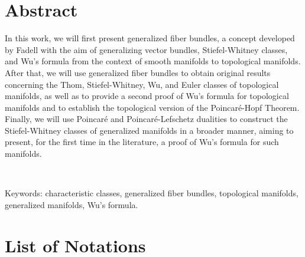 \documentclass[12pt,oneside]{book}
\begin{document}
    \chapter*{Abstract}
    \thispagestyle{empty}

    In this work, we will first present generalized fiber bundles, a concept developed by Fadell with the aim 
    of generalizing vector bundles, Stiefel-Whitney classes, and Wu's formula from the context of smooth 
    manifolds to topological manifolds. After that, we will use generalized fiber bundles to obtain original 
    results concerning the Thom, Stiefel-Whitney, Wu, and Euler classes of topological manifolds, as 
    well as to provide a second proof of Wu's formula for topological manifolds and to establish the 
    topological version of the Poincaré-Hopf Theorem. Finally, we will use Poincaré and 
    Poincaré-Lefschetz dualities to construct the Stiefel-Whitney classes of generalized manifolds in a 
    broader manner, aiming to present, for the first time in the literature, a proof of Wu's formula 
    for such manifolds.

    \

    \noindent Keywords: characteristic classes, generalized fiber bundles, topological manifolds, generalized 
    manifolds, Wu's formula.



    \tableofcontents
    \thispagestyle{empty}

    \listoffigures
    \thispagestyle{empty}



    \chapter*{List of Notations}
    \thispagestyle{empty}
\end{document}

